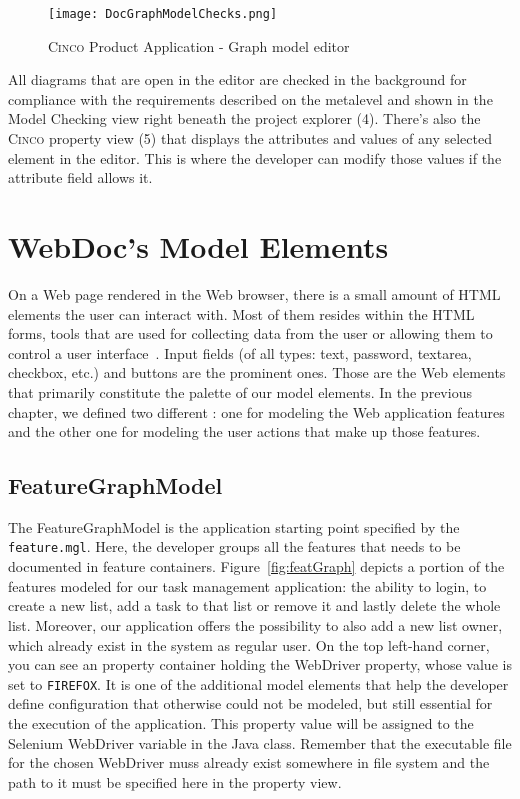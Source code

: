 \begin{figure}[h]
    \centering
    \texttt{[image: DocGraphModelChecks.png]}
    \caption{\textsc{Cinco} Product Application - Graph model editor}\label{fig:graphDSL}
\end{figure}

All diagrams that are open in the editor are checked in the background for compliance with the requirements described on the metalevel and shown in the Model Checking view right beneath the project explorer (4). There's also the \textsc{Cinco} property view (5) that displays the attributes and values of any selected element in the editor. This is where the developer can modify those values if the attribute field allows it.

\section{WebDoc's Model Elements}\label{sec:WebDocModelElem}

On a Web page rendered in the Web browser, there is a small amount of HTML elements the user can interact with. Most of them resides within the HTML forms, tools that are used for collecting data from the user or allowing them to control a user interface~\cite{mozillaMDN}. Input fields (of all types: text, password, textarea, checkbox, etc.) and buttons are the prominent ones. Those are the Web elements that primarily constitute the palette of our model elements. In the previous chapter, we defined two different : one for modeling the Web application features and the other one for modeling the user actions that make up those features.

\subsection{FeatureGraphModel}\label{sec:FeaGrahptModElem}

The FeatureGraphModel is the application starting point specified by the \lstinline{feature.mgl}. Here, the developer groups all the features that needs to be documented in feature containers. Figure~\ref{fig:featGraph} depicts a portion of the features modeled for our task management application: the ability to login, to create a new list, add a task to that list or remove it and lastly delete the whole list. Moreover, our application offers the possibility to also add a new list owner, which already exist in the system as regular user. On the top left-hand corner, you can see an property container holding the WebDriver property, whose value is set to \lstinline[language=MGL]{FIREFOX}. It is one of the additional model elements that help the developer define configuration that otherwise could not be modeled, but still essential for the execution of the application. This property value will be assigned to the Selenium WebDriver variable in the Java class. Remember that the executable file for the chosen WebDriver muss already exist somewhere in file system and the path to it must be specified here in the property view.

